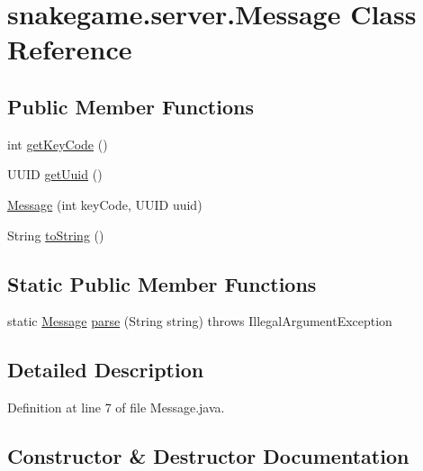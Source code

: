 \hypertarget{classsnakegame_1_1server_1_1_message}{}\section{snakegame.\+server.\+Message Class Reference}
\label{classsnakegame_1_1server_1_1_message}
\subsection*{Public Member Functions}
\begin{DoxyCompactItemize}
\item 
int \mbox{\hyperlink{classsnakegame_1_1server_1_1_message_ab530cae742ab3546af0531af6decfb4d}{get\+Key\+Code}} ()
\item 
U\+U\+ID \mbox{\hyperlink{classsnakegame_1_1server_1_1_message_a1813db6854615d0d545e7e7a24f73fe4}{get\+Uuid}} ()
\item 
\mbox{\hyperlink{classsnakegame_1_1server_1_1_message_a785c5537fe6e83fbc944dc86cc130db4}{Message}} (int key\+Code, U\+U\+ID uuid)
\item 
String \mbox{\hyperlink{classsnakegame_1_1server_1_1_message_a9e38b76d6815d73d7c14a28e8640b1c3}{to\+String}} ()
\end{DoxyCompactItemize}
\subsection*{Static Public Member Functions}
\begin{DoxyCompactItemize}
\item 
static \mbox{\hyperlink{classsnakegame_1_1server_1_1_message}{Message}} \mbox{\hyperlink{classsnakegame_1_1server_1_1_message_a18e375c0d7b140c6b4d141b870542a4a}{parse}} (String string)  throws Illegal\+Argument\+Exception 
\end{DoxyCompactItemize}


\subsection{Detailed Description}


Definition at line 7 of file Message.\+java.



\subsection{Constructor \& Destructor Documentation}
\mbox{\label{classsnakegame_1_1server_1_1_message_a785c5537fe6e83fbc944dc86cc130db4}} 

